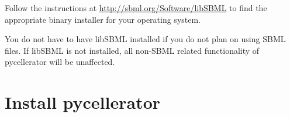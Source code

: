 Follow the instructions at \href{http://sbml.org/Software/libSBML}{http://sbml.org/Software/libSBML} to find the appropriate binary installer for your operating system. 

You do not have to have libSBML installed if you do not plan on using SBML files. If libSBML is not installed, all non-SBML related functionality of pycellerator will be unaffected. 

\section{Install pycellerator}
